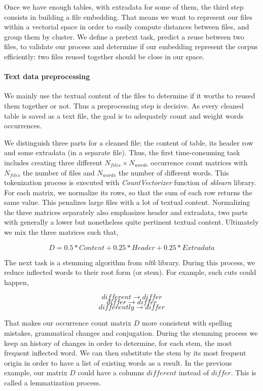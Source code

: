 \documentclass[a4paper]{article}
\begin{document}
	Once we have enough tables, with extradata for some of them, the third step consists in building a file embedding. That means we want to represent our files within a vectorial space in order to easily compute distances between files, and group them by cluster. We define a pretext task, predict a reuse between two files, to validate our process and determine if our embedding represent the corpus efficiently: two files reused together should be close in our space.
	
	\paragraph{Text data preprocessing}
	
	We mainly use the textual content of the files to determine if it worths to reused them together or not. Thus a preprocessing step is decisive. As every cleaned table is saved as a text file, the goal is to adequately count and weight words occurrences. 
	
	We distinguish three parts for a cleaned file: the content of table, its header row and some extradata (in a separate file). Thus, the first time-consuming task includes creating three different $N_{files} \times N_{words}$ occurrence count matrices with $N_{files}$ the number of files and $N_{words}$ the number of different words. This tokenization process is executed with \emph{CountVectorizer} function of \emph{sklearn} library. For each matrix, we normalize its rows, so that the sum of each row returns the same value. This penalizes large files with a lot of textual content. Normalizing the three matrices separately also emphasizes header and extradata, two parts with generally a lower but nonetheless quite pertinent textual content. Ultimately we mix the three matrices such that,
	
	\begin{equation}
		D = 0.5 * Content + 0.25 * Header + 0.25 * Extradata		
	\end{equation}
	
	The next task is a stemming algorithm from \emph{nltk} library. During this process, we reduce inflected words to their root form (or stem). For example, such cuts could happen,
	
	\[
		different \rightarrow differ
	\]
	\[
		differ \rightarrow differ
	\]
	\[
		differently \rightarrow differ
	\]

	That makes our occurrence count matrix $D$ more consistent with spelling mistakes, grammatical changes and conjugation. During the stemming process we keep an history of changes in order to determine, for each stem, the most frequent inflected word. We can then substitute the stem by its most frequent origin in order to have a list of existing words as a result. In the previous example, our matrix $D$ could have a columns $different$ instead of $differ$. This is called a lemmatization process.
	
\end{document}
